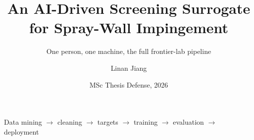 \documentclass[aspectratio=169,11pt]{beamer}
\title[AI Spray-Penetration Surrogate]{An AI-Driven Screening Surrogate for Spray-Wall Impingement}
\subtitle{One person, one machine, the full frontier-lab pipeline}
\author{Linan Jiang}
\institute{Aalto University}
\date{MSc Thesis Defense, 2026}
\newcommand{\blue}[1]{\textcolor{aaltoBlue}{#1}}
\begin{document}
\begin{frame}
  \titlepage
  \begin{center}\small\blue{Data mining $\to$ cleaning $\to$ targets $\to$ training $\to$ evaluation $\to$ deployment}\end{center}
\end{frame}


\end{document}
